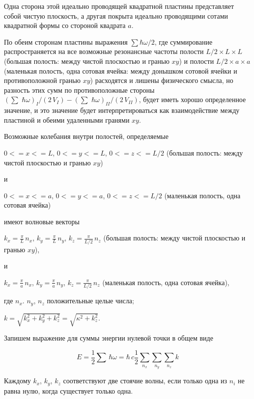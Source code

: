 \documentclass[11pt]{article}
\begin{document}
Одна сторона этой идеально проводящей квадратной пластины представляет
собой чистую плоскость, а другая покрыта идеально проводящими сотами
квадратной формы со стороной квадрата \(a\).

По обеим сторонам пластины выражения \(\sum\hbar\omega\big/2\), где
суммирование распространяется на все возможные резонансные частоты
полости \(L/2\times L\times L\) (большая полость: между чистой
плоскостью и гранью \(xy\)) и полости \(L/2\times a\times a\) (маленькая
полость, одна сотовая ячейка: между донышком сотовой ячейки и
противоположной гранью \(xy\)) расходятся и лишены физического смысла,
но разность этих сумм по противоположные стороны
\(\left(\sum\,\,\hbar\omega\right)_{I}\big/{\left(2\,V_{ I}\right)} - \left(\sum\,\,\hbar\omega\right)_{II}\big/{\left(2\,V_{II}\right)}\),
будет иметь хорошо определенное значение, и это значение будет
интерпретироваться как взаимодействие между пластиной и обеими
удаленными гранями \(xy\).

    Возможные колебания внутри полостей, определяемые

    \(0<=x<=L\), \(0<=y<=L\), \(0<=z<=L/2\) (большая полость: между чистой
плоскостью и гранью \(xy\))

    и

    \(0<=x<=a\), \(0<=y<=a\), \(0<=z<=L/2\) (маленькая полость, одна сотовая
ячейка)

    имеют волновые векторы

    \(k_x = \frac{\pi}{L}\,n_x\), \(k_y = \frac{\pi}{L}\,n_y\),
\(k_z = \frac{\pi}{L/2}\,n_z\) (большая полость: между чистой плоскостью
и гранью \(xy\)),

    и

    \(k_x = \frac{\pi}{a}\,n_x\), \(k_y = \frac{\pi}{a}\,n_y\),
\(k_z = \frac{\pi}{L/2}\,n_z\) (маленькая полость, одна сотовая ячейка),

где \(n_x\). \(n_y\), \(n_z\) положительные целые числа;

    \(k = \sqrt{k_x^2+k_y^2+k_z^2} = \sqrt{\kappa^2+k_z^2}\).

Запишем выражение для суммы энергии нулевой точки в общем виде

\begin{equation}
E = \frac{1}{2}\sum\,\hbar\omega = \hbar\,c\frac{1}{2}\sum\limits_{n_x}^{}\sum\limits_{n_y}^{}\sum\limits_{n_z}^{}k
\end{equation}

    Каждому \(k_x\), \(k_y\), \(k_z\) соответствуют две стоячие волны, если
только одна из \(n_i\) не равна нулю, когда существует только одна.
\end{document}
